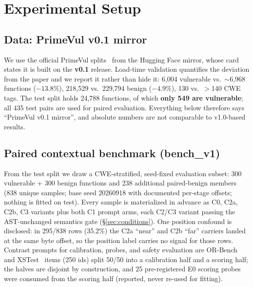 \section{Experimental Setup}
\label{sec:setup}

\subsection{Data: PrimeVul v0.1 mirror}
We use the official PrimeVul splits~\cite{ding2025primevul} from the
 Hugging Face mirror, whose card states it is
built on the \textbf{v0.1} release. Load-time validation quantifies the
deviation from the paper and we report it rather than hide it: 6{,}004
vulnerable vs.\ $\sim$6{,}968 functions ($-13.8\%$), 218{,}529 vs.\ 229{,}794
benign ($-4.9\%$), 130 vs.\ $>$140 CWE tags. The test split holds 24{,}788
functions, of which \textbf{only 549 are vulnerable}; all 435 test pairs are
used for paired evaluation. Everything below therefore says ``PrimeVul v0.1
mirror'', and absolute numbers are not comparable to v1.0-based results.

\subsection{Paired contextual benchmark (bench\_v1)}
From the test split we draw a CWE-stratified, seed-fixed evaluation subset:
300 vulnerable + 300 benign functions and 238 additional paired-benign
members (838 unique samples; base seed 20260918 with documented per-stage
offsets; nothing is fitted on test). Every sample is materialized in advance
as C0, C2a, C2b, C3 variants plus both C1 prompt arms, each C2/C3 variant
passing the AST-unchanged semantics gate (\S\ref{sec:conditions}). One
position confound is disclosed: in 295/838 rows (35.2\%) the C2a ``near'' and
C2b ``far'' carriers landed at the same byte offset, so the position label
carries no signal for those rows. Contrast prompts for calibration, probes,
and safety evaluation are OR-Bench~\cite{cui2025orbench} and
XSTest~\cite{rottger2024xstest} items (250 ids) split 50/50 into a
calibration half and a scoring half; the halves are disjoint by construction,
and 25 pre-registered E0 scoring probes were consumed from the scoring half
(reported, never re-used for fitting).

